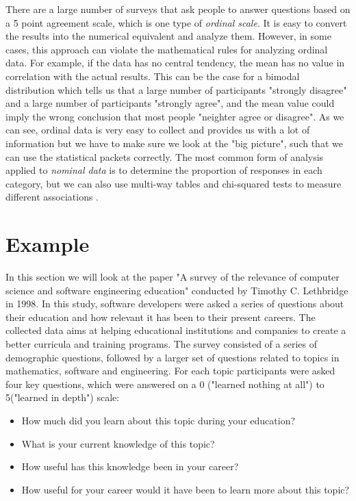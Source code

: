 \documentclass{report}
\begin{document}
There are a large number of surveys that ask people to answer questions based on a 5 point agreement scale, which is one type of \textit{ordinal scale}. It is easy to convert the results into the numerical equivalent and analyze them. However, in some cases, this approach can violate the mathematical rules for analyzing ordinal data. For example, if the data has no central tendency, the mean has no value in correlation with the actual results. This can be the case for a bimodal distribution which tells us that a large number of participants "strongly disagree" and a large number of participants "strongly agree", and the mean value could imply the wrong conclusion that most people "neighter agree or disagree". As we can see, ordinal data is very easy to collect and provides us with a lot of information but we have to make sure we look at the "big picture", such that we can use the statistical packets correctly. The most common form of analysis applied to \textit{nominal data} is to determine the proportion of responses in each category, but we can also use multi-way tables and chi-squared tests to measure different associations \cite{Kitchenham6}.

\chapter{Example}
In this section we will look at the paper "A survey of the relevance of computer science and software engineering education" conducted by Timothy C. Lethbridge in 1998. In this study, software developers were asked a series of questions about their education and how relevant it has been to their present careers. The collected data aims at helping educational institutions and companies to create a better curricula and training programs. The survey consisted of a series of demographic questions, followed by a larger set of questions related to topics in mathematics, software and engineering. For each topic participants were asked four key questions, which were answered on a 0 ("learned nothing at all") to 5("learned in depth") scale: 
\begin{itemize}
\item How much did you learn about this topic during your education?\\
\item What is your current knowledge of this topic?\\
\item How useful has this knowledge been in your career?\\
\item How useful for your career would it have been to learn more about this topic?\\
\end{itemize}
\end{document}
